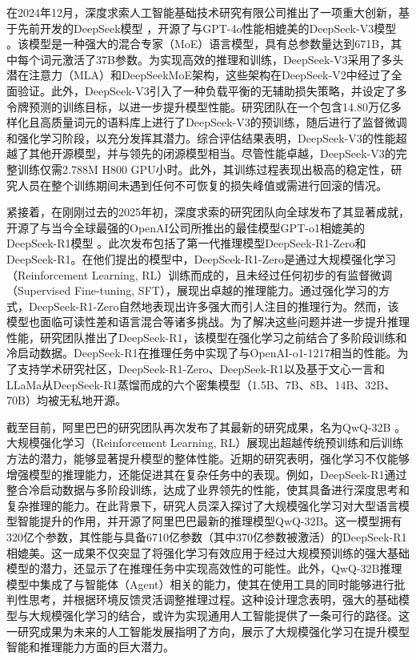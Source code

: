 在2024年12月，深度求索人工智能基础技术研究有限公司推出了一项重大创新，基于先前开发的DeepSeek模型 \cite{deepseekai2024deepseekllmscalingopensource, deepseekai2024deepseekv2strongeconomicalefficient}，开源了与GPT-4o性能相媲美的DeepSeek-V3模型 \cite{deepseekai2024deepseekv3technicalreport}。该模型是一种强大的混合专家（MoE）语言模型，具有总参数量达到671B，其中每个词元激活了37B参数。为实现高效的推理和训练，DeepSeek-V3采用了多头潜在注意力（MLA）和DeepSeekMoE架构，这些架构在DeepSeek-V2中经过了全面验证。此外，DeepSeek-V3引入了一种负载平衡的无辅助损失策略，并设定了多令牌预测的训练目标，以进一步提升模型性能。研究团队在一个包含14.80万亿多样化且高质量词元的语料库上进行了DeepSeek-V3的预训练，随后进行了监督微调和强化学习阶段，以充分发挥其潜力。综合评估结果表明，DeepSeek-V3的性能超越了其他开源模型，并与领先的闭源模型相当。尽管性能卓越，DeepSeek-V3的完整训练仅需2.788M H800 GPU小时。此外，其训练过程表现出极高的稳定性，研究人员在整个训练期间未遇到任何不可恢复的损失峰值或需进行回滚的情况。

紧接着，在刚刚过去的2025年初，深度求索的研究团队向全球发布了其显著成就，开源了与当今全球最强的OpenAI公司所推出的最佳模型GPT-o1相媲美的DeepSeek-R1模型 \cite{deepseekai2025deepseekr1incentivizingreasoningcapability}。此次发布包括了第一代推理模型DeepSeek-R1-Zero和DeepSeek-R1。在他们提出的模型中，DeepSeek-R1-Zero是通过大规模强化学习（Reinforcement Learning, RL）训练而成的，且未经过任何初步的有监督微调（Supervised Fine-tuning, SFT），展现出卓越的推理能力。通过强化学习的方式，DeepSeek-R1-Zero自然地表现出许多强大而引人注目的推理行为。然而，该模型也面临可读性差和语言混合等诸多挑战。为了解决这些问题并进一步提升推理性能，研究团队推出了DeepSeek-R1，该模型在强化学习之前结合了多阶段训练和冷启动数据。DeepSeek-R1在推理任务中实现了与OpenAI-o1-1217相当的性能。为了支持学术研究社区，DeepSeek-R1-Zero、DeepSeek-R1以及基于文心一言和LLaMa从DeepSeek-R1蒸馏而成的六个密集模型（1.5B、7B、8B、14B、32B、70B）均被无私地开源。

截至目前，阿里巴巴的研究团队再次发布了其最新的研究成果，名为QwQ-32B \cite{qwq32b}。大规模强化学习（Reinforcement Learning, RL）展现出超越传统预训练和后训练方法的潜力，能够显著提升模型的整体性能。近期的研究表明，强化学习不仅能够增强模型的推理能力，还能促进其在复杂任务中的表现。例如，DeepSeek-R1通过整合冷启动数据与多阶段训练，达成了业界领先的性能，使其具备进行深度思考和复杂推理的能力。在此背景下，研究人员深入探讨了大规模强化学习对大型语言模型智能提升的作用，并开源了阿里巴巴最新的推理模型QwQ-32B。这一模型拥有320亿个参数，其性能与具备6710亿参数（其中370亿参数被激活）的DeepSeek-R1相媲美。这一成果不仅突显了将强化学习有效应用于经过大规模预训练的强大基础模型的潜力，还显示了在推理任务中实现高效性的可能性。此外，QwQ-32B推理模型中集成了与智能体（Agent）相关的能力，使其在使用工具的同时能够进行批判性思考，并根据环境反馈灵活调整推理过程。这种设计理念表明，强大的基础模型与大规模强化学习的结合，或许为实现通用人工智能提供了一条可行的路径。这一研究成果为未来的人工智能发展指明了方向，展示了大规模强化学习在提升模型智能和推理能力方面的巨大潜力。

